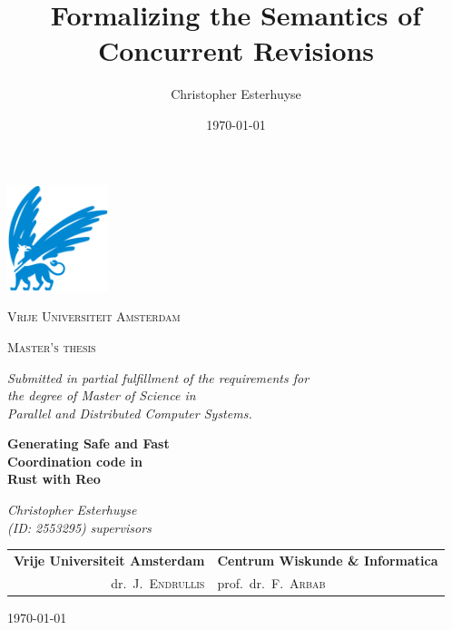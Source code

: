 \documentclass[11pt]{report}
\title{Formalizing the Semantics of Concurrent Revisions}
\author{Christopher Esterhuyse}
\date{\today}
\begin{document}
\begin{titlepage}
	\centering
	\includegraphics[width=0.22\textwidth, trim={0 0.15cm 0 0}, clip]{img/vu.png}
	\par
	{\scshape\huge Vrije Universiteit Amsterdam \par}
	\vspace{1.5cm}
	{\scshape\LARGE Master's thesis\par \par
	\vspace{0.2cm}
	\small \textit{Submitted in partial fulfillment of the requirements for\\ the degree of Master of Science in\\ Parallel and Distributed Computer Systems.}\par}
	\vspace{1.5cm}
	{\Huge\bfseries \rm \textbf{Generating Safe and Fast\\ Coordination code in\\ Rust with Reo}\par}
	\vspace{1.5cm}
	{\Large\itshape\rm \noindent\textit{Christopher Esterhuyse}\\}
	\vspace{1mm}
	\textit{(ID: 2553295)}
	\vfill
		\rm \noindent \textit{supervisors} \\ \vspace{0.15cm}
	\begin{tabular}{r@{\hskip 0.4in}l}
\rm \hspace{3mm} \textbf{Vrije Universiteit Amsterdam} & \textbf{Centrum Wiskunde \& Informatica} \\ 
dr.\ J.\ \textsc{Endrullis} & prof.\ dr.\ F.\ \textsc{Arbab}
\end{tabular}

	\vfill

	{\large \today\par}
\end{titlepage}
\end{document}
